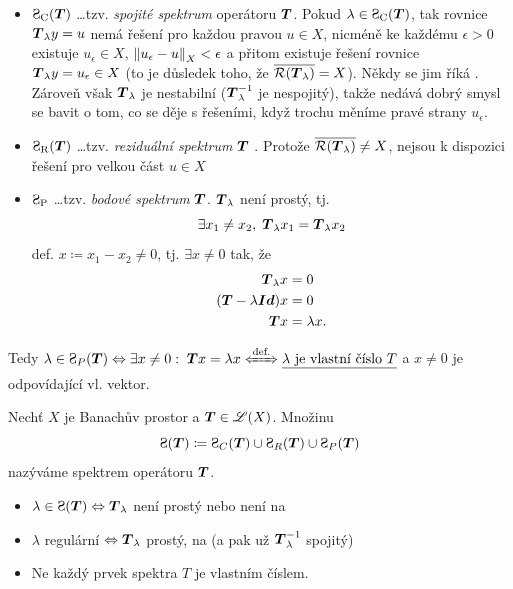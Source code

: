 \begin{remark}
\begin{itemize}
    \item $\SpC(\map T)$ \dots tzv. \emph{spojité spektrum} operátoru $ \boldsymbol{T} $. Pokud $\lambda\in \SpC(\map T)$, tak rovnice $\boldsymbol{T}_\lambda y=u$ nemá řešení pro každou pravou  $u\in X$, nicméně ke každému $\epsilon>0$ existuje $u_\epsilon\in X$, $\left\lVert u_\epsilon-u\right\rVert_X<\epsilon$ a přitom existuje řešení rovnice $\boldsymbol{T}_\lambda y=u_\epsilon\in X$ (to je důsledek toho, že $\overline{\mathcal{R}( \boldsymbol{T}_\lambda)}=X$). Někdy se jim říká . Zároveň však $ \boldsymbol{T}_\lambda$ je nestabilní ($ \boldsymbol{T}_\lambda^{-1}$ je nespojitý), takže nedává dobrý smysl se bavit o tom, co se děje s řešeními, když trochu měníme pravé strany $u_\epsilon$.
    \item $\SpR( \map T )$ \dots tzv. \emph{reziduální spektrum}  $\boldsymbol{T}$ . Protože $\overline{\mathcal{R}(\boldsymbol{T}_\lambda)}\neq X$, nejsou k dispozici řešení pro velkou část $u\in X$
    \item $\SpP$ \dots tzv. \emph{bodové spektrum} $ \boldsymbol{T} $. $ \boldsymbol{T}_\lambda$ není prostý, tj. 
    $$\exists x_1\neq x_2,\;  \boldsymbol{T}_\lambda x_1= \boldsymbol{T}_\lambda x_2 $$
    def. $x\coloneqq x_1-x_2\neq 0$, tj. $\exists x\neq 0$ tak, že 
    \begin{equation*}
    \begin{split}
        \boldsymbol{T}_\lambda x &=0 \\
        (\boldsymbol{T} -\lambda\boldsymbol{Id})x&=0\\
        \boldsymbol{T} x&=\lambda x.
    \end{split} 
    \end{equation*}
    
\end{itemize}
\end{remark}


Tedy $\lambda\in\Sp_P(\map T) \Leftrightarrow \exists x\neq 0:\; \map Tx = \lambda x \xLeftrightarrow{\text{def.}} \uu{\lambda\text{ je vlastní číslo }T}$ a $x\neq0$ je odpovídající vl. vektor.

\begin{definition}
Nechť $X$ je Banachův prostor a $\boldsymbol{T} \in \mathscr{L}(X)$. Množinu $$ \Sp(\map T)\coloneqq \Sp_C(\map T)\cup \Sp_R(\map T) \cup \Sp_P(\map T)$$ nazýváme spektrem operátoru $\boldsymbol{T}$.
\end{definition}


\begin{itemize}
    \item $\lambda\in \Sp(\map T)\Leftrightarrow \map T_\lambda$ není prostý nebo není na
    \item $\lambda$ regulární $\Leftrightarrow \boldsymbol{T}_\lambda$ prostý, na (a pak už $\boldsymbol{T}_\lambda^{-1}$ spojitý)
    \item Ne každý prvek spektra $T$ je vlastním číslem.
\end{itemize}

